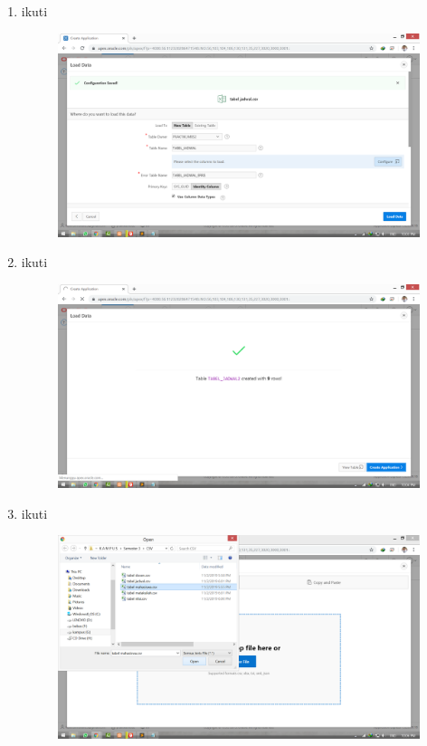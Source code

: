\documentclass[11pt]{article}
\begin{document}
\begin{enumerate}
\item ikuti
\begin{figure}
        \centerline{\includegraphics[scale=0.1]{img/14loaddatatabel.png}}
        \caption{}
		\label{langkah15}
\end{figure}

\item ikuti
\begin{figure}
        \centerline{\includegraphics[scale=0.1]{img/15createtabel.png}}
        \caption{}
		\label{langkah16}
\end{figure}

\item ikuti
\begin{figure}
        \centerline{\includegraphics[scale=0.1]{img/16dragtabel.png}}
        \caption{}
		\label{langkah17}
\end{figure}


\end{enumerate}
\end{document}
